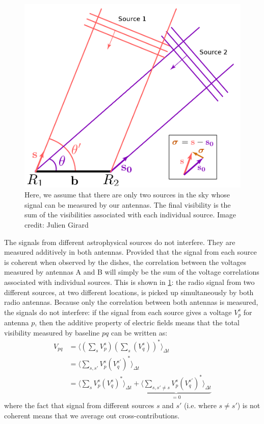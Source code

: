 \begin{figure}[ht]
\centering
\includegraphics[width=.5\textwidth]{images/visibility-measure.png}
\caption{\label{fig.visibility.measure} Here, we assume that there are only two sources in the sky whose signal can be measured by our antennas. The final visibility is the sum of the visibilities associated with each individual source. Image credit: Julien Girard }
\end{figure}

\pg
The signals from different astrophysical sources do not interfere. They are measured additively in both antennas. Provided that the signal from each source is coherent when observed by the dishes, the correlation between the voltages measured by antennas A and B will simply be the sum of the voltage correlations associated with individual sources. This is shown in \cref{fig.visibility.measure}: the radio signal from two different sources, at two different locations, is picked up simultaneously by both radio antennas. Because only the correlation between both antennas is measured, the signals do not interfere: if the signal from each source gives a voltage $V_{p}^s$ for antenna $p$, then the additive property of electric fields means that the total visibility measured by baseline $pq$ can be written as:
\begin{align}
V_{pq}  &= \langle \left(\sum_{s} V_{p}^s\right) \left(\sum_{s} (V_{q}^s)\right)^*  \rangle_{\Delta t} \\
        &= \langle \sum_{s,s'} V_{p}^s (V_q^{s'})^*  \rangle_{\Delta t}\\
        &= \langle \sum_s V_{p}^s (V_q^{s})^* \rangle_{\Delta t} + \underbrace{\langle \sum_{s,s'\ne s} V_{p}^s (V_q^{s'})^* \rangle_{\Delta t}}_{=0} \label{eq.spatial.incor}
\end{align}
where the fact that signal from different sources $s$ and $s'$ (i.e. where $s\ne s'$) is not coherent means that we average out cross-contributions. 

